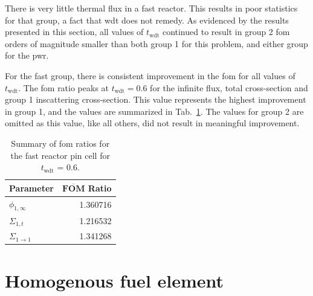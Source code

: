 There is very little thermal flux in a fast reactor. This results in
poor statistics for that group, a fact that \gls{wdt} does not
remedy. As evidenced by the results presented in this section, all
values of $t_{\mathrm{wdt}}$ continued to result in group 2 \gls{fom} orders
of magnitude smaller than both group 1 for this problem, and either
group for the \gls{pwr}.

For the fast group, there is consistent improvement in the \gls{fom}
for all values of $t_{\mathrm{wdt}}$. The \gls{fom} ratio peaks at
$t_{\mathrm{wdt}} = 0.6$ for the infinite flux, total cross-section
and group 1 inscattering cross-section. This value represents the
highest improvement in group 1, and the values are summarized in
Tab.~\ref{tab:fast_discussion}. The values for group 2 are omitted as
this value, like all others, did not result in meaningful improvement.

\begin{table}[hbtp]
  \centering
  \caption{Summary of \acrshort{fom} ratios for the fast reactor pin
  cell for $t_{\mathrm{wdt}}$ = 0.6.}
  \begin{tabular}{lr}\toprule
    \textbf{Parameter}& $\overline{\mathbf{FOM}}$ \textbf{Ratio} \\ \midrule
    $\phi_{1, \infty}$ & 1.360716 \\
    $\Sigma_{1,t}$ & 1.216532 \\
    $\Sigma_{1 \to 1}$ & 1.341268 \\ \bottomrule
  \end{tabular}
  \label{tab:fast_discussion}
\end{table}

\newpage
\section{Homogenous fuel element}
\label{sec:homog}

